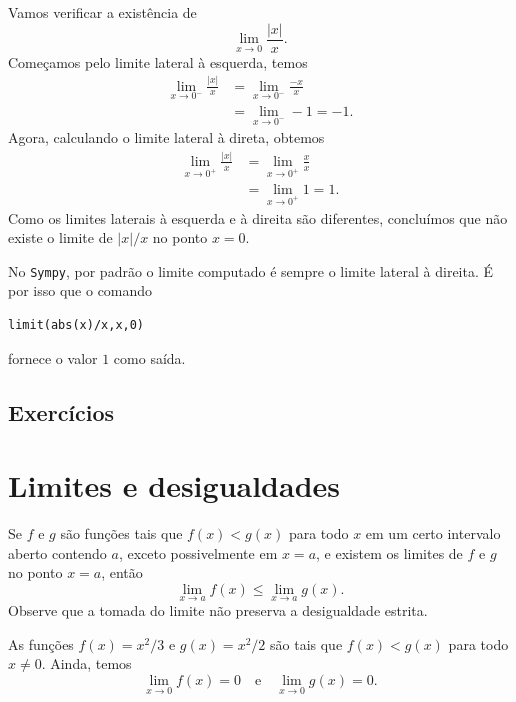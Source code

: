 \begin{exer}
  Vamos verificar a existência de
  \begin{equation}
    \lim_{x\to 0} \frac{|x|}{x}.
  \end{equation}
  Começamos pelo limite lateral à esquerda, temos
  \begin{align}
    \lim_{x\to 0^-} \frac{|x|}{x} &= \lim_{x\to 0^-} \frac{-x}{x}\\
    &= \lim_{x\to 0^-} -1 = -1.
  \end{align}
  Agora, calculando o limite lateral à direta, obtemos
  \begin{align}
    \lim_{x\to 0^+} \frac{|x|}{x} &= \lim_{x\to 0^+} \frac{x}{x}\\
    &= \lim_{x\to 0^+} 1 = 1.
  \end{align}
  Como os limites laterais à esquerda e à direita são diferentes, concluímos que não existe o limite de $|x|/x$ no ponto $x=0$.

  \ifispython
  No \verb+Sympy+, por padrão o limite computado é sempre o limite lateral à direita. É por isso que o comando
\begin{verbatim}
limit(abs(x)/x,x,0)
\end{verbatim}
  fornece o valor $1$ como saída.
  \fi
\end{exer}

\subsection*{Exercícios}

\emconstrucao

\section{Limites e desigualdades}\label{cap_lim_sec_limdes}

Se $f$ e $g$ são funções tais que $f(x)<g(x)$ para todo $x$ em um certo intervalo aberto contendo $a$, exceto possivelmente em $x=a$, e existem os limites de $f$ e $g$ no ponto $x=a$, então
\begin{equation}
  \lim_{x\to a} f(x) \leq \lim_{x\to a} g(x).
\end{equation}
Observe que a tomada do limite não preserva a desigualdade estrita.

\begin{exer}
  As funções $f(x) = x^2/3$ e $g(x) = x^2/2$ são tais que $f(x) < g(x)$ para todo $x\neq 0$. Ainda, temos
  \begin{equation}
    \lim_{x\to 0} f(x) = 0\quad\text{e}\quad\lim_{x\to 0} g(x) = 0.
  \end{equation}
\end{exer}

